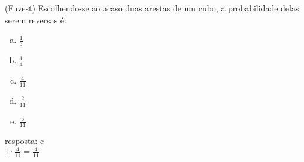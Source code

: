 \begin{ex}
 (Fuvest) Escolhendo-se ao acaso duas arestas de um cubo, a probabilidade delas serem reversas é:
    \begin{enumerate}[(a)]
    \item $\frac{1}{3}$
    \item $\frac{1}{4}$
    \item $\frac{4}{11}$
    \item $\frac{2}{11}$
    \item $\frac{5}{11}$
    \end{enumerate}
      \begin{sol}
      resposta: c \\
      $1\cdot\frac{4}{11}=\frac{4}{11}$
      \end{sol}
\end{ex}
